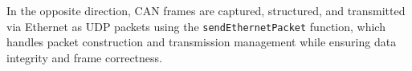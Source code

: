 In the opposite direction, CAN frames are captured, structured, and transmitted via Ethernet as UDP packets using the \verb|sendEthernetPacket| function, which handles packet construction and transmission management while ensuring data integrity and frame correctness.

 



